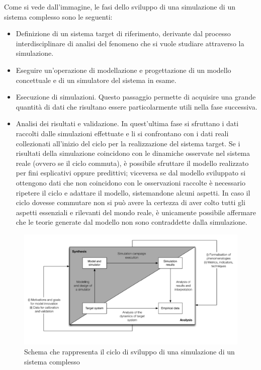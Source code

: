 \documentclass[11pt]{article}
\begin{document}
Come si vede dall'immagine, le fasi dello sviluppo di una simulazione di un sistema complesso sono le seguenti: 
\begin{itemize}
    \item Definizione di un sistema target di riferimento, derivante dal processo interdisciplinare di analisi del fenomeno che si vuole studiare attraverso la simulazione. 
    \item Eseguire un'operazione di modellazione e progettazione di un modello concettuale e di un simulatore del sistema in esame. 
    \item Esecuzione di simulazioni. Questo passaggio permette di acquisire una grande quantità di dati che risultano essere particolarmente utili nella fase successiva.
    \item Analisi dei risultati e validazione. In quest'ultima fase si sfruttano i dati raccolti dalle simulazioni effettuate e li si confrontano con i dati reali collezionati all'inizio del ciclo per la realizzazione del sistema target. Se i risultati della simulazione coincidono con le dinamiche osservate nel sistema reale (ovvero se il ciclo commuta), è possibile sfruttare il modello realizzato per fini esplicativi oppure predittivi; viceversa se dal modello sviluppato si ottengono dati che non coincidono con le osservazioni raccolte è necessario ripetere il ciclo e adattare il modello, sistemandone alcuni aspetti. In caso il ciclo dovesse commutare non si può avere la certezza di aver colto tutti gli aspetti essenziali e rilevanti del mondo reale, è unicamente possibile affermare che le teorie generate dal modello non sono contraddette dalla simulazione. 
\end{itemize}

\begin{figure}
    \centering
    \includegraphics[scale = 0.6]{cicloSviluppoSimulazione.png}
    \caption{Schema che rappresenta il ciclo di sviluppo di una simulazione di un sistema complesso}
    \label{figCicloSviluppo}
\end{figure}
\end{document}
